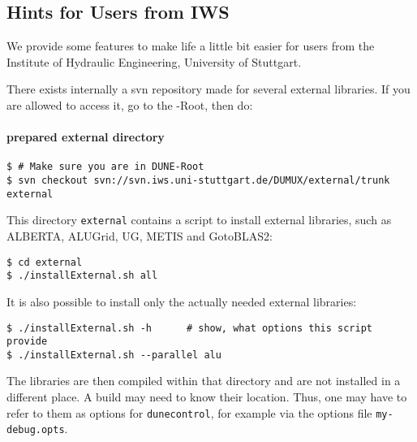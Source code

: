 \subsection{Hints for Users from IWS}
We provide some features to make life a little bit easier for
users from the Institute of Hydraulic Engineering, University of Stuttgart.

There exists internally a svn repository made for several external libraries.
If you are allowed to access it, go to the {\Dune}-Root, then do: 
\paragraph{prepared external directory}

\begin{lstlisting}[style=Bash]
$ # Make sure you are in DUNE-Root
$ svn checkout svn://svn.iws.uni-stuttgart.de/DUMUX/external/trunk external
\end{lstlisting}

This directory \texttt{external} contains a script to install external libraries, such as 
ALBERTA, ALUGrid, UG, METIS and GotoBLAS2: 

\begin{lstlisting}[style=Bash]
$ cd external
$ ./installExternal.sh all
\end{lstlisting}

It is also possible to install only the actually needed external libraries:

\begin{lstlisting}[style=Bash]
$ ./installExternal.sh -h      # show, what options this script provide
$ ./installExternal.sh --parallel alu
\end{lstlisting}

The libraries are then compiled within that directory and are not installed in a different place. 
A \Dune build may need to know their location. Thus, one may have to refer to them as options for \texttt{dunecontrol}, 
for example via the options file \texttt{my-debug.opts}.

